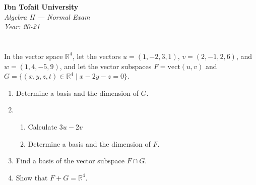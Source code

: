\documentclass[12pt]{article}
\begin{document}
\begin{center}
  \Large\textbf{Ibn Tofail University} \\[1em]
  \large\textit{Algebra II — Normal Exam} \\[0.5em]
  \large\textit{Year: 20-21} \\[2em]
\end{center}

\vspace{0.5cm}

\section{}
In the vector space $\mathbb{R}^4$, let the vectors $u = (1,-2,3,1)$, $v = (2,-1,2,6)$, and $w = (1,4,-5,9)$, and let the vector subspaces $F = \text{vect}(u,v)$ and $G = \{(x,y,z,t) \in \mathbb{R}^4 \mid x - 2y - z = 0\}$.

\begin{enumerate}
    \item Determine a basis and the dimension of $G$.
    \item 
    \begin{enumerate}
        \item Calculate $3u - 2v$
        \item Determine a basis and the dimension of $F$.
    \end{enumerate}
    \item Find a basis of the vector subspace $F \cap G$.
    \item Show that $F + G = \mathbb{R}^4$.
\end{enumerate}

\newpage
\end{document}
